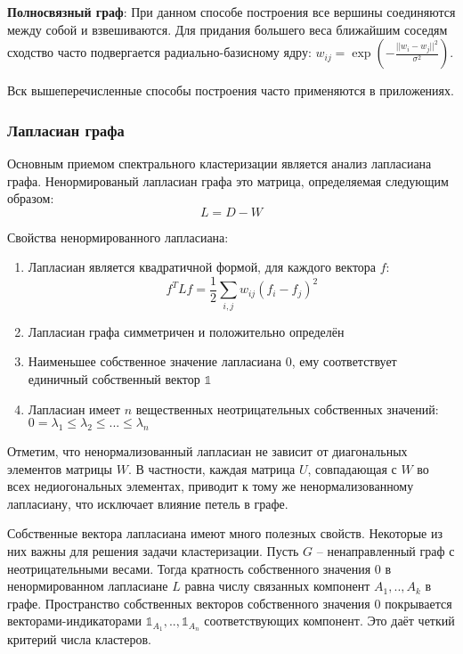 \textbf{Полносвязный граф}: При данном способе построения все вершины соединяются между собой и взвешиваются. Для придания большего веса ближайшим соседям сходство часто подвергается радиально-базисному ядру: $w_{ij}=\exp(-\frac{||w_i - w_j||^2}{\sigma^2})$. 

Вск вышеперечисленные способы построения часто применяются в приложениях. 

\subsubsection{Лапласиан графа}
Основным приемом спектрального кластеризации является анализ лапласиана графа. Ненормированый лапласиан графа это матрица, определяемая следующим образом:
\begin{equation}
	L = D - W
\end{equation}

Свойства ненормированного лапласиана:
\begin{enumerate}
	\item Лапласиан является квадратичной формой, для каждого вектора $\mathit{f}$:
	\begin{equation}
		f^T L f = \frac12 \sum_{i,j} w_{ij}(f_i - f_j)^2
	\end{equation} 
	\item Лапласиан графа симметричен и положительно определён
	\item Наименьшее собственное значение лапласиана 0, ему соответствует единичный собственный вектор $\mathbb{1}$
	\item Лапласиан имеет $n$ вещественных неотрицательных собственных значений: $0=\lambda_1 \leq \lambda_2 \leq ... \leq \lambda_n$
\end{enumerate}

Отметим, что ненормализованный лапласиан не зависит от диагональных элементов матрицы $W$. В частности, каждая матрица $U$, совпадающая с $W$ во всех недиогональных элементах, приводит к тому же ненормализованному лапласиану, что исключает влияние петель в графе. 

Собственные вектора лапласиана имеют много полезных свойств. Некоторые из них важны для решения задачи кластеризации. Пусть $G$ -- ненаправленный граф с неотрицательными весами. Тогда кратность собственного значения 0 в ненормированном лапласиане $L$ равна числу связанных компонент $A_1,..,A_k$ в графе. Пространство собственных векторов собственного значения 0 покрывается векторами-индикаторами $\mathbb{1}_{A_1},..,\mathbb{1}_{A_n}$ соответствующих компонент. Это даёт четкий критерий числа кластеров.

